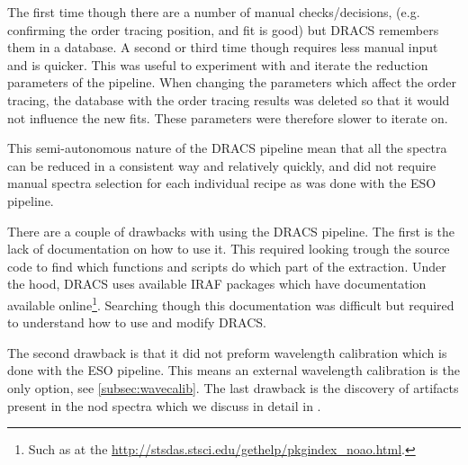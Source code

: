 The first time though there are a number of manual checks/decisions, (e.g. confirming the order tracing position, and fit is good) but DRACS remembers them in a database. A second or third time though requires less manual input and is quicker. This was useful to experiment with and iterate the reduction parameters of the pipeline. When changing the parameters which affect the order tracing, the  database with the order tracing results was deleted so that it would not influence the new fits. These parameters were therefore slower to iterate on. 

This semi-autonomous nature of the DRACS pipeline mean that all the spectra can be reduced in a consistent way and relatively quickly, and did not require manual spectra selection for each individual recipe as was done with the ESO pipeline.

There are a couple of drawbacks with using the DRACS pipeline. The first is the lack of documentation on how to use it. This required looking trough the source code to find which functions and scripts do which part of the extraction. Under the hood, DRACS uses available IRAF packages which have documentation available online\footnote{Such as at the \href{Space Telescope Science Institute}{http://stsdas.stsci.edu/gethelp/pkgindex\_noao.html}.}. Searching though this documentation was difficult but required to understand how to use and modify DRACS.

The second drawback is that it did not preform wavelength calibration which is done with the ESO pipeline. This means an external wavelength calibration is the only option, see \ref{subsec:wavecalib}. The last drawback is the discovery of artifacts present in the nod spectra which we discuss in detail in 
.

